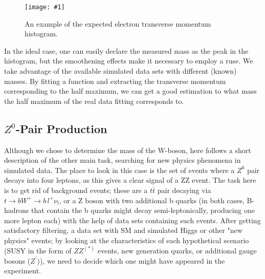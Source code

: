 \documentclass[twocolumn]{article}
\newcommand{\insertFigure}[1]{%
   \texttt{[image: \#1]}%
}
\begin{document}
\begin{figure}
\centering
\insertFigure{Images/WmassExample.eps}
\caption{An example of the expected electron transverse momentum histogram.\cite{WMassExperiment}}
\end{figure}
In the ideal case, one can easily declare the measured mass as the peak in the histogram, but the smoothening effects make it necessary to employ a ruse. We take advantage of the available simulated data sets with different (known) masses. By fitting a function and extracting the transverse momentum corresponding to the half maximum, we can get a good estimation to what mass the half maximum of the real data fitting corresponds to. %
\subsection{$Z^0$-Pair Production}
Although we chose to determine the mass of the W-boson, here follows a short description of the other main task, searching for new physics phenomena in simulated data. The place to look in this case is the set of events where a $Z^0$ pair decays into four leptons, as this gives a clear signal of a ZZ event. The task here is to get rid of background events; these are a $t \bar{t}$ pair decaying via $t \rightarrow b W^+ \rightarrow b \, l^+ \nu_l$, or a Z boson with two additional b quarks (in both cases, B-hadrons that contain the b quarks might decay semi-leptonically, producing one more lepton each) with the help of data sets containing such events. After getting satisfactory filtering, a data set with SM and simulated Higgs or other "new physics" events; by looking at the characteristics of each hypothetical scenario (SUSY in the form of $Z Z^{(*)}$ events, new generation quarks, or additional gauge bosons ($Z^\prime$)), we need to decide which one might have appeared in the experiment.
\end{document}
